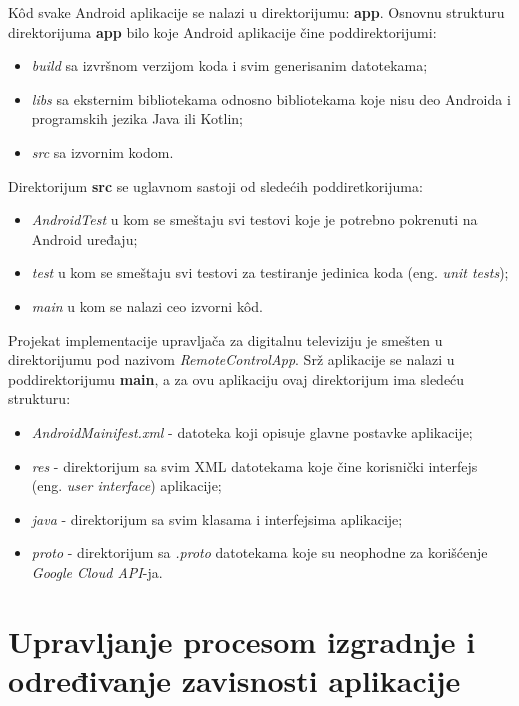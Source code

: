 \documentclass[implementacija.tex]{subfiles}
\begin{document}
K\^{o}d svake Android aplikacije se nalazi u direktorijumu: \textbf{app}. Osnovnu strukturu direktorijuma \textbf{app} bilo koje Android aplikacije čine poddirektorijumi: 

\begin{itemize}
\item \textit{build} sa izvršnom verzijom koda i svim generisanim datotekama;
\item \textit{libs} sa eksternim bibliotekama odnosno bibliotekama koje nisu deo Androida i programskih jezika Java ili Kotlin;
\item \textit{src} sa izvornim kodom.
\end{itemize}

 Direktorijum \textbf{src} se uglavnom sastoji od sledećih poddiretkorijuma: 
\begin{itemize}
\item \textit{AndroidTest} u kom se smeštaju svi testovi koje je potrebno pokrenuti na Android uređaju;
\item \textit{test} u kom se smeštaju svi testovi za testiranje jedinica koda (eng. \textit{unit tests});
\item \textit{main} u kom se nalazi ceo izvorni k\^{o}d.
\end{itemize}

Projekat implementacije upravljača za digitalnu televiziju je smešten u direktorijumu pod nazivom \textit{RemoteControlApp}. Srž aplikacije se nalazi u poddirektorijumu \textbf{main}, a za ovu aplikaciju ovaj direktorijum ima sledeću strukturu:
\begin{itemize}
\item \textit{AndroidMainifest.xml} - datoteka koji opisuje glavne postavke aplikacije;
\item \textit{res} - direktorijum sa svim XML datotekama koje čine korisnički interfejs (eng. \textit{user interface}) aplikacije;
\item \textit{java} - direktorijum sa svim klasama i interfejsima aplikacije;
\item \textit{proto} - direktorijum sa \textit{.proto} datotekama koje su neophodne za korišćenje \textit{Google Cloud API}-ja.
\end{itemize}

\section{Upravljanje procesom izgradnje i određivanje zavisnosti aplikacije}
\end{document}
